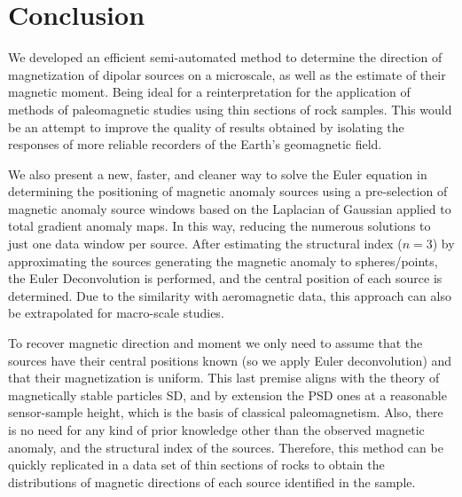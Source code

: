 \section{Conclusion}

We developed an efficient semi-automated method to determine the direction of magnetization of dipolar sources on a microscale, as well as the estimate of their magnetic moment.
Being ideal for a reinterpretation for the application of methods of paleomagnetic studies using thin sections of rock samples.
This would be an attempt to improve the quality of results obtained by isolating the responses of more reliable recorders of the Earth's geomagnetic field.

We also present a new, faster, and cleaner way to solve the Euler equation in determining the positioning of magnetic anomaly sources using a pre-selection of magnetic anomaly source windows based on the Laplacian of Gaussian applied to total gradient anomaly maps.
In this way, reducing the numerous solutions to just one data window per source.
After estimating the structural index ($n = 3$) by approximating the sources generating the magnetic anomaly to spheres/points, the Euler Deconvolution is performed, and the central position of each source is determined.
Due to the similarity with aeromagnetic data, this approach can also be extrapolated for macro-scale studies.

To recover magnetic direction and moment we only need to assume that the sources have their central positions known (so we apply Euler deconvolution) and that their magnetization is uniform.
This last premise aligns with the theory of magnetically stable particles SD, and by extension the PSD ones at a reasonable sensor-sample height, which is the basis of classical paleomagnetism.
Also, there is no need for any kind of prior knowledge other than the observed magnetic anomaly, and the structural index of the sources.
Therefore, this method can be quickly replicated in a data set of thin sections of rocks to obtain the distributions of magnetic directions of each source identified in the sample.

